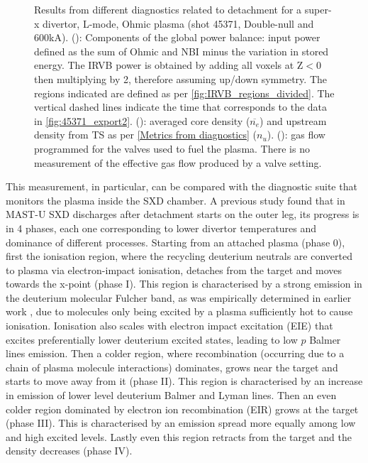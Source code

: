 \begin{figure}[!ht]
\begin{subfigure}{0.8\linewidth}
         \vspace*{-7mm}
         \caption{\phantom{ww}}
         \label{fig:mu01_tomo5c}
     \end{subfigure}
     \vspace*{-3mm}
     \caption{Results from different diagnostics related to detachment for a super-x divertor, L-mode, Ohmic plasma (shot 45371, Double-null and 600kA). (): Components of the global power balance: input power defined as the sum of Ohmic and NBI minus the variation in stored energy. The IRVB power is obtained by adding all voxels at Z$<$0 then multiplying by 2, therefore assuming up/down symmetry. The regions indicated are defined as per \autoref{fig:IRVB_regions_divided}. The vertical dashed lines indicate the time that corresponds to the data in \autoref{fig:45371_export2}. (): averaged core density ($\overline{n_e}$) and upstream density from TS as per \autoref{Metrics from diagnostics} ($n_u$). (): gas flow programmed for the valves used to fuel the plasma. There is no measurement of the effective gas flow produced by a valve setting.}
	\label{fig:mu01_tomo5}
\end{figure}

This measurement, in particular, can be compared with the diagnostic suite that monitors the plasma inside the SXD chamber. A previous study found that in MAST-U SXD discharges after detachment starts on the outer leg, its progress is in 4 phases, each one corresponding to lower divertor temperatures and dominance of different processes.\cite{Verhaegh2022} Starting from an attached plasma (phase 0), first the ionisation region, where the recycling deuterium neutrals are converted to plasma via electron-impact ionisation, detaches from the target and moves towards the x-point (phase I). This region is characterised by a strong emission in the deuterium molecular Fulcher band, as was empirically determined in earlier work \cite{Verhaegh2020}, due to molecules only being excited by a plasma sufficiently hot to cause ionisation. Ionisation also scales with electron impact excitation (EIE) that excites preferentially lower deuterium excited states, leading to low $p$ Balmer lines emission. Then a colder region, where recombination (occurring due to a chain of plasma molecule interactions) dominates, grows near the target and starts to move away from it (phase II). This region is characterised by an increase in emission of lower level deuterium Balmer and Lyman lines. Then an even colder region dominated by electron ion recombination (EIR) grows at the target (phase III). This is characterised by an emission spread more equally among low and high excited levels. Lastly even this region retracts from the target and the density decreases (phase IV).

